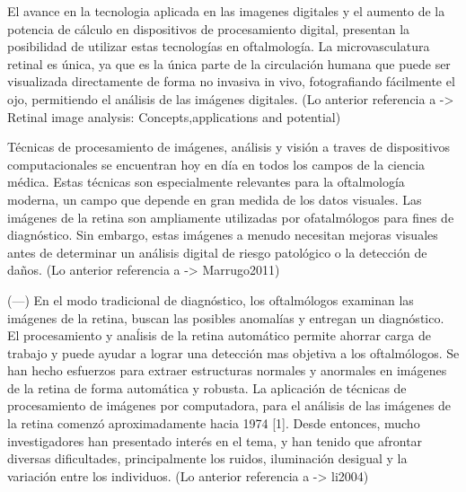El avance en la tecnologia aplicada en las imagenes digitales y  el aumento de la potencia de c\'alculo en dispositivos de procesamiento digital, presentan la posibilidad de utilizar estas tecnolog\'ias en oftalmolog\'ia. La microvasculatura retinal es \'unica, ya que es la \'unica parte de la circulaci\'on humana que puede ser visualizada directamente de forma no invasiva in vivo, fotografiando f\'acilmente el ojo, permitiendo el an\'alisis de las im\'agenes digitales.
(Lo anterior referencia a -> Retinal image analysis: Concepts,applications and potential)

T\'ecnicas de procesamiento de imágenes, análisis y visión a traves de dispositivos computacionales se encuentran hoy en d\'ia en todos los campos de la ciencia m\'edica. Estas técnicas son especialmente relevantes para la oftalmología moderna, un campo que depende en gran medida de los datos visuales. Las im\'agenes de la retina son ampliamente utilizadas por ofatalm\'ologos para fines de diagn\'ostico. Sin embargo, estas im\'agenes a menudo necesitan mejoras visuales antes de determinar un an\'alisis digital de riesgo patol\'ogico o la detecci\'on de da\~nos. 
(Lo anterior referencia a -> Marrugo2011)

(---)
En el modo tradicional de diagn\'ostico, los oftalm\'ologos examinan las im\'agenes de la retina, buscan las posibles anomal\'ias y entregan un diagn\'ostico. El procesamiento y ana\'lisis de la retina autom\'atico permite ahorrar carga de trabajo y puede ayudar a lograr una detecci\'on mas objetiva a los oftalm\'ologos. Se han hecho esfuerzos para extraer estructuras normales y anormales en im\'agenes de la retina de forma autom\'atica y robusta. La aplicaci\'on de t\'ecnicas de procesamiento de im\'agenes por computadora, para el an\'alisis de las im\'agenes de la retina comenz\'o aproximadamente hacia 1974 [1]. Desde entonces, mucho investigadores han presentado inter\'es en el tema, y han tenido que afrontar diversas dificultades, principalmente los ruidos, iluminaci\'on desigual y la variaci\'on entre los individuos. 
(Lo anterior referencia a -> li2004)

